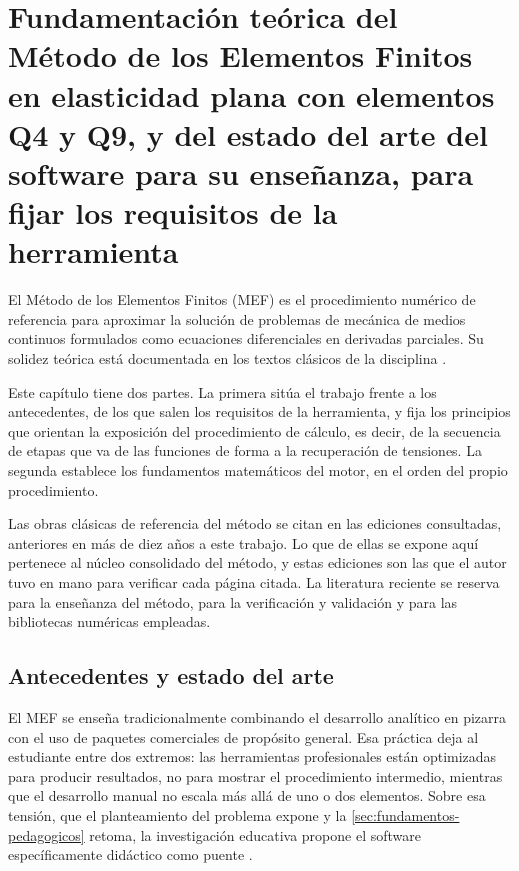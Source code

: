 \chapter{Fundamentación teórica del Método de los Elementos Finitos en elasticidad plana con elementos Q4 y Q9, y del estado del arte del software para su enseñanza, para fijar los requisitos de la herramienta}
\label{cap:marco_teorico}

El Método de los Elementos Finitos (MEF) es el procedimiento numérico de referencia para aproximar la solución de problemas de mecánica de medios continuos formulados como ecuaciones diferenciales en derivadas parciales. Su solidez teórica está documentada en los textos clásicos de la disciplina \autocite{zienkiewicz2013fem,bathe2014fem,cook2002concepts}.

Este capítulo tiene dos partes. La primera sitúa el trabajo frente a los antecedentes, de los que salen los requisitos de la herramienta, y fija los principios que orientan la exposición del procedimiento de cálculo, es decir, de la secuencia de etapas que va de las funciones de forma a la recuperación de tensiones. La segunda establece los fundamentos matemáticos del motor, en el orden del propio procedimiento.

Las obras clásicas de referencia del método se citan en las ediciones consultadas, anteriores en más de diez años a este trabajo. Lo que de ellas se expone aquí pertenece al núcleo consolidado del método, y estas ediciones son las que el autor tuvo en mano para verificar cada página citada. La literatura reciente se reserva para la enseñanza del método, para la verificación y validación y para las bibliotecas numéricas empleadas.

\section{Antecedentes y estado del arte}
\label{sec:antecedentes}

El MEF se enseña tradicionalmente combinando el desarrollo analítico en pizarra con el uso de paquetes comerciales de propósito general. Esa práctica deja al estudiante entre dos extremos: las herramientas profesionales están optimizadas para producir resultados, no para mostrar el procedimiento intermedio, mientras que el desarrollo manual no escala más allá de uno o dos elementos. Sobre esa tensión, que el planteamiento del problema expone y la \autoref{sec:fundamentos-pedagogicos} retoma, la investigación educativa propone el software específicamente didáctico como puente \autocite{bishay2020teaching,lee2015interactive,perezsantiago2023fem}.

